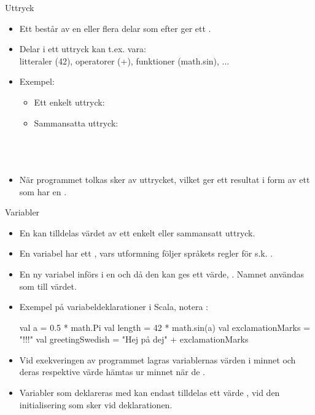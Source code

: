 \begin{Slide}{Uttryck}
\begin{itemize}
\item Ett  består av en eller flera delar som efter  ger ett .
\item Delar i ett uttryck kan t.ex. vara: \\ litteraler (42), operatorer (+), funktioner (math.sin), ...
\item Exempel:
\begin{itemize}
\item Ett enkelt uttryck: \\ 
\item Sammansatta uttryck: \\
 \\
 \\
 \\
\end{itemize}

\item När programmet tolkas sker  av uttrycket, vilket ger ett resultat i form av ett  som har en .
\end{itemize}
\end{Slide}


\begin{Slide}{Variabler}\SlideFontSmall

\ifkompendium
\ExplainVariable

\ExplainAssignment
\fi

\begin{itemize}
\item En  kan tilldelas värdet av ett enkelt eller sammansatt uttryck.
\item En variabel har ett , vars utformning följer språkets regler för s.k. .
\item En ny variabel införs i en  och då den kan ges ett värde, . Namnet användas som  till värdet.
\item Exempel på variabeldeklarationer i Scala, notera  :
\begin{Code}
val a = 0.5 * math.Pi
val length = 42 * math.sin(a)
val exclamationMarks = "!!!"
val greetingSwedish = "Hej på dej" + exclamationMarks
\end{Code}

\item Vid exekveringen av programmet lagras variablernas värden i minnet och deras respektive värde hämtas ur minnet när de .

\item Variabler som deklareras med  kan endast tilldelas ett värde , vid den initialisering som sker vid deklarationen.
\end{itemize}

\end{Slide}


